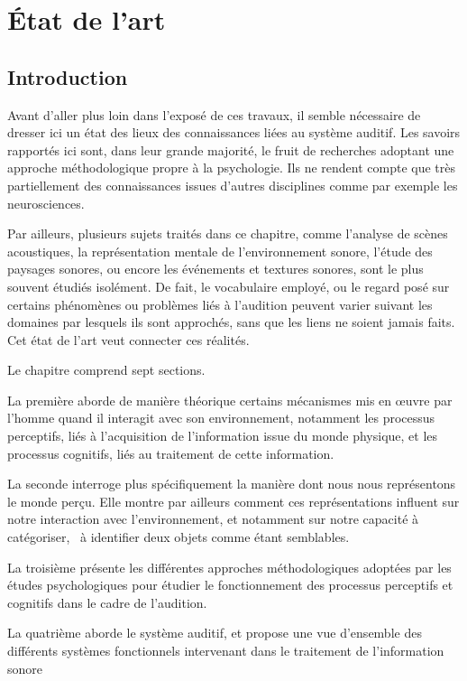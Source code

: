 \chapter{État de l'art}\label{ch:psycho_ea}

\section{Introduction}

Avant d'aller plus loin dans l'exposé de ces travaux, il semble nécessaire de dresser ici un état des lieux des connaissances liées au système auditif. Les savoirs rapportés ici sont, dans leur grande majorité, le fruit de recherches adoptant une approche méthodologique propre à la psychologie. Ils ne rendent compte que très partiellement des connaissances issues d'autres disciplines comme par exemple les neurosciences.

Par ailleurs, plusieurs sujets traités dans ce chapitre, comme l'analyse de scènes acoustiques, la représentation mentale de l'environnement sonore, l'étude des paysages sonores, ou encore les événements et textures sonores, sont le plus souvent étudiés isolément. De fait, le vocabulaire employé, ou le regard posé sur certains phénomènes ou problèmes liés à l'audition peuvent varier suivant les domaines par lesquels ils sont approchés, sans que les liens ne soient jamais faits. Cet état de l'art veut connecter ces réalités.

Le chapitre comprend sept sections.

La première aborde de manière théorique certains mécanismes mis en œuvre par l'homme quand il interagit avec son environnement, notamment les processus perceptifs, liés à l'acquisition de l'information issue du monde physique, et les processus cognitifs, liés au traitement de cette information.

La seconde interroge plus spécifiquement la manière dont nous nous représentons le monde perçu. Elle montre par ailleurs comment ces représentations influent sur notre interaction avec l'environnement, et notamment sur notre capacité à catégoriser, \ie~à identifier deux objets comme étant semblables.

La troisième présente les différentes approches méthodologiques adoptées par les études psychologiques pour étudier le fonctionnement des processus perceptifs et cognitifs dans le cadre de l'audition.

La quatrième aborde le système auditif, et propose une vue d'ensemble des différents systèmes fonctionnels intervenant dans le traitement de l'information sonore 

